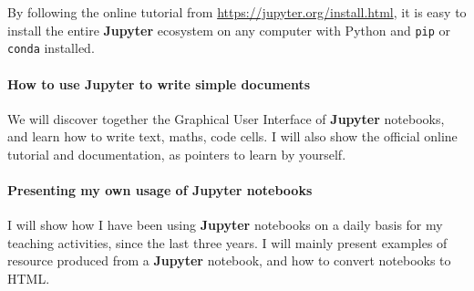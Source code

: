 \documentclass[runningheads]{llncs}
\newcommand{\Jupyter}{\textbf{Jupyter}}
\begin{document}
By following the online tutorial from \url{https://jupyter.org/install.html}, it is easy to install the entire \Jupyter{} ecosystem on any computer with Python and \texttt{pip} or \texttt{conda} installed.


\paragraph{How to use \Jupyter{} to write simple documents}

We will discover together the Graphical User Interface of \Jupyter{} notebooks, and learn how to write text, maths, code cells.
%
I will also show the official online tutorial and documentation, as pointers to learn by yourself.


\paragraph{Presenting my own usage of \Jupyter{} notebooks}

I will show how I have been using \Jupyter{} notebooks on a daily basis for my teaching activities, since the last three years.
I will mainly present examples of resource produced from a \Jupyter{} notebook, and how to convert notebooks to HTML.
\end{document}
